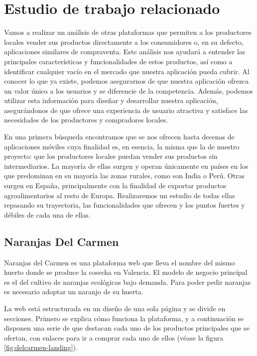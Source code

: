 
\section{Estudio de trabajo relacionado}\label{sec:estudio-trabajo-relacionado}

Vamos a realizar un análisis de otras plataformas que permiten a los productores locales vender sus productos directamente a los consumidores o, en su defecto, aplicaciones similares de compraventa. Este análisis nos ayudará a entender las principales características y funcionalidades de estos productos, así como a identificar cualquier vacío en el mercado que nuestra aplicación pueda cubrir. Al conocer lo que ya existe, podemos asegurarnos de que nuestra aplicación ofrezca un valor único a los usuarios y se diferencie de la competencia. Además, podemos utilizar esta información para diseñar y desarrollar nuestra aplicación, asegurándonos de que ofrece una experiencia de usuario atractiva y satisface las necesidades de los productores y compradores locales.

En una primera búsqueda encontramos que se nos ofrecen hasta decenas de aplicaciones móviles cuya finalidad es, en esencia, la misma que la de nuestro proyecto: que los productores locales puedan vender sus productos sin intermediarios. La mayoría de ellas surgen y operan únicamente en países en los que predominan en su mayoría las zonas rurales, como son India o Perú. Otras surgen en España, principalmente con la finalidad de exportar productos agroalimentarios al resto de Europa. Realizaremos un estudio de todas ellas repasando su trayectoria, las funcionalidades que ofrecen y los puntos fuertes y débiles de cada una de ellas.

\subsection{Naranjas Del Carmen}

Naranjas del Carmen es una plataforma web que lleva el nombre del mismo huerto donde se produce la cosecha en Valencia. El modelo de negocio principal es el del cultivo de naranjas ecológicas bajo demanda. Para poder pedir naranjas es necesario adoptar un naranjo de su huerta.

La web está estructurada en un diseño de una sola página y se divide en secciones. Primero se explica cómo funciona la plataforma, y a continuación se disponen una serie de  que destacan cada uno de los productos principales que se ofertan, con enlaces para ir a comprar cada uno de ellos (véase la figura \ref{fig:delcarmen-landing}).

